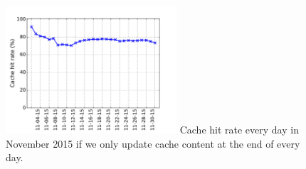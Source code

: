 \begin{figure}[t!]
\begin{center}
\includegraphics[width=2.5in]{figure/LRU_day}
{Cache hit rate every day in November 2015 if we only update cache content at the end of every day.}
\end{center}
\end{figure}
